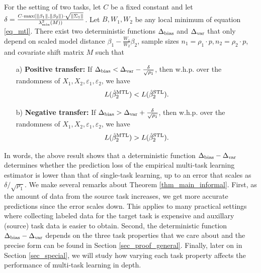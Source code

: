 \begin{theorem}\label{thm_main_informal}
	For the setting of two tasks, let $C$ be a fixed constant and let $\delta = \frac{ C\cdot \max(\|\beta_1\|, \|\beta_2\|) \cdot \sqrt{\|\Sigma_1\|} } {\lambda_{\min}^2(M)) }$.
	Let $B, W_1, W_2$ be any local minimum of equation \eqref{eq_mtl}.
 	There exist two deterministic functions $\Delta_{\text{bias}}$ and $\Delta_{\text{var}}$ that only depend on scaled model distance $\beta_1 - \frac{W_1}{W_2} \beta_2$, sample sizes $n_1 = \rho_1 \cdot p, n_2 = \rho_2 \cdot p$, and covariate shift matrix $M$ such that
	\begin{enumerate}
		\item[a)] \textbf{Positive transfer:} If $\Delta_{\text{bias}} < \Delta_{\text{var}} -  \frac{\delta}{\sqrt{\rho_1}} $, then w.h.p. over the randomness of $X_1, X_2, \varepsilon_1, \varepsilon_2$, we have
			\[ L(\hat{\beta}_2^{\textup{MTL}}) < L(\hat{\beta}_2^{\textup{STL}}).  \]
		\item[b)] \textbf{Negative transfer:} If $\Delta_{\text{bias}} > \Delta_{\text{var}} + \frac{\delta}{\sqrt{\rho_1}}$, then w.h.p. over the randomness of $X_1, X_2, \varepsilon_1, \varepsilon_2$, we have
			\[ L(\hat{\beta}_2^{\textup{MTL}}) > L(\hat{\beta}_2^{\textup{STL}}). \]
	\end{enumerate}
\end{theorem}
In words, the above result shows that a deterministic function $\Delta_{\text{bias}} - \Delta_{\text{var}}$ determines whether the prediction loss of the empirical multi-task learning estimator is lower than that of single-task learning, up to an error that scales as $\delta / \sqrt{\rho_1}$.
We make several remarks about Theorem \ref{thm_main_informal}.
First, as the amount of data from the source task increases, we get more accurate predictions  since the error scales down.
This applies to many practical settings where collecting labeled data for the target task is expensive and auxillary (source) task data is easier to obtain.
Second, the deterministic function $\Delta_{\text{bias}} - \Delta_{\text{var}}$ depends on the three task properties that we care about and the precise form can be found in Section \ref{sec_proof_general}.
Finally, later on in Section \ref{sec_special}, we will study how varying each task property affects the performance of multi-task learning in depth.

